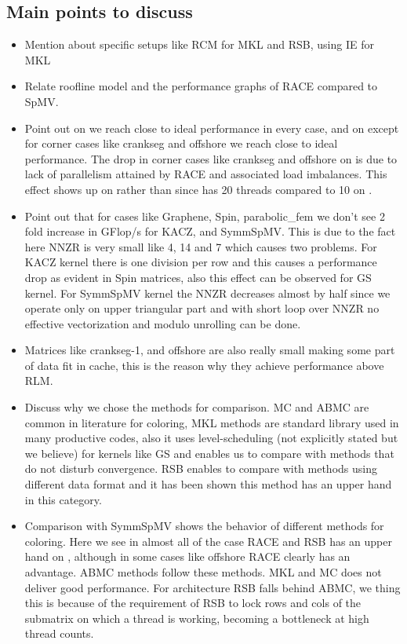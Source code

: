 \subsection{Main points to discuss}
\begin{itemize}
	\item Mention about specific setups like RCM for MKL and RSB, using IE for MKL
	\item Relate roofline model and the performance graphs of RACE compared to SpMV. 
	\item Point out on \IVB we reach close to ideal performance in every case, and on \SKX except for corner cases like crankseg and offshore we reach close to ideal performance. The drop in corner cases like crankseg and offshore on \SKX is due to lack of parallelism attained by RACE and associated load imbalances. This effect shows up on \SKX rather than \IVB since \SKX has 20 threads compared to 10 on \IVB.
	\item Point out that for cases like Graphene, Spin, parabolic\_fem we don't see 2 fold increase in GFlop/s for KACZ, and SymmSpMV. This is due to the fact here \acrshort{NNZR} is very small like 4, 14 and 7 which causes two problems. For KACZ kernel there is one division per row and this causes a performance drop as evident in Spin matrices, also this effect can be observed for GS kernel. For SymmSpMV kernel the \acrshort{NNZR} decreases almost by half since we operate only on upper triangular part and with short loop over \acrshort{NNZR} no effective vectorization and modulo unrolling can be done.
	\item Matrices like crankseg-1, and offshore are also really small making some part of data fit in cache, this is the reason why they achieve performance above RLM.
	\item Discuss why we chose the methods for comparison. MC and ABMC are common in literature for \DONE coloring, MKL methods are standard library used in many productive codes, also it uses level-scheduling (not explicitly stated but we believe) for kernels like GS and enables us to compare with methods that do not disturb convergence. RSB enables to compare with methods using different data format and it has been shown this method has an upper hand in this category. 
	\item Comparison with SymmSpMV shows the behavior of different methods for \DTWO coloring. Here we see in almost all of the case RACE and RSB has an upper hand on \IVB, although in some cases like offshore RACE clearly has an advantage. ABMC methods follow these methods. MKL and MC does not deliver good performance. For \SKX architecture \acrshort{RSB} falls behind \acrshort{ABMC}, we thing this is because of the requirement of \acrshort{RSB} to lock rows and cols of the submatrix on which a thread is working, becoming a bottleneck at high thread counts.

\end{itemize}
